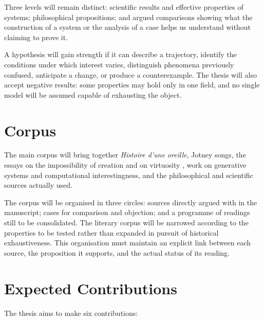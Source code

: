 \documentclass[11pt,a4paper]{article}
\begin{document}
Three levels will remain distinct: scientific results and effective properties
of systems; philosophical propositions; and argued comparisons showing what
the construction of a system or the analysis of a case helps us understand
without claiming to prove it.

A hypothesis will gain strength if it can describe a trajectory, identify the
conditions under which interest varies, distinguish phenomena previously
confused, anticipate a change, or produce a counterexample. The thesis will also
accept negative results: some properties may hold only in one field, and no
single model will be assumed capable of exhausting the object.

\section{Corpus}

The main corpus will bring together \emph{Histoire d'une oreille}, Jotney songs,
the essays on the impossibility of creation and on virtuosity
\parencite{pachet2018oreille,pachet2026impossibilite,pachet2027virtuosite}, work
on generative systems and computational interestingness, and the philosophical
and scientific sources actually used.

The corpus will be organised in three circles: sources directly argued with in
the manuscript; cases for comparison and objection; and a programme of readings
still to be consolidated. The literary corpus will be narrowed according to the
properties to be tested rather than expanded in pursuit of historical
exhaustiveness. This organisation must maintain an explicit link between each
source, the proposition it supports, and the actual status of its reading.

\section{Expected Contributions}

The thesis aims to make six contributions:
\end{document}
